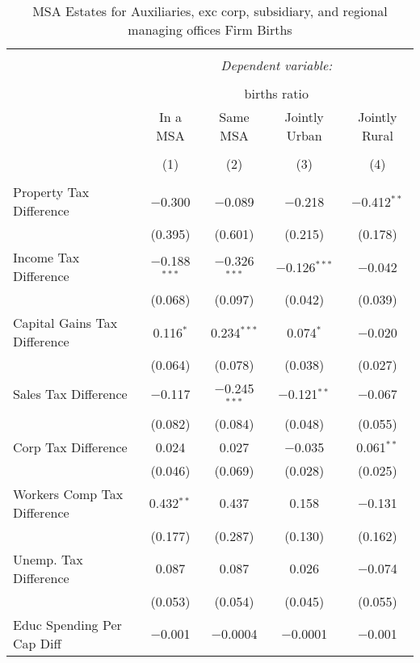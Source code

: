 
\begin{table}[!htbp] \centering 
  \caption{MSA Estates for  Auxiliaries, exc corp, subsidiary, and regional managing offices Firm Births} 
  \label{} 
\begin{tabular}{@{\extracolsep{5pt}}lcccc} 
\\[-1.8ex]\hline 
\hline \\[-1.8ex] 
 & \multicolumn{4}{c}{\textit{Dependent variable:}} \\ 
\cline{2-5} 
\\[-1.8ex] & \multicolumn{4}{c}{births ratio} \\ 
 & In a MSA & Same MSA & Jointly Urban & Jointly Rural \\ 
\\[-1.8ex] & (1) & (2) & (3) & (4)\\ 
\hline \\[-1.8ex] 
 Property Tax Difference & $-$0.300 & $-$0.089 & $-$0.218 & $-$0.412$^{**}$ \\ 
  & (0.395) & (0.601) & (0.215) & (0.178) \\ 
  Income Tax Difference & $-$0.188$^{***}$ & $-$0.326$^{***}$ & $-$0.126$^{***}$ & $-$0.042 \\ 
  & (0.068) & (0.097) & (0.042) & (0.039) \\ 
  Capital Gains Tax Difference & 0.116$^{*}$ & 0.234$^{***}$ & 0.074$^{*}$ & $-$0.020 \\ 
  & (0.064) & (0.078) & (0.038) & (0.027) \\ 
  Sales Tax Difference & $-$0.117 & $-$0.245$^{***}$ & $-$0.121$^{**}$ & $-$0.067 \\ 
  & (0.082) & (0.084) & (0.048) & (0.055) \\ 
  Corp Tax Difference & 0.024 & 0.027 & $-$0.035 & 0.061$^{**}$ \\ 
  & (0.046) & (0.069) & (0.028) & (0.025) \\ 
  Workers Comp Tax Difference & 0.432$^{**}$ & 0.437 & 0.158 & $-$0.131 \\ 
  & (0.177) & (0.287) & (0.130) & (0.162) \\ 
  Unemp. Tax Difference & 0.087 & 0.087 & 0.026 & $-$0.074 \\ 
  & (0.053) & (0.054) & (0.045) & (0.055) \\ 
  Educ Spending Per Cap Diff & $-$0.001 & $-$0.0004 & $-$0.0001 & $-$0.001 \\ 

\end{tabular}
\end{table}
